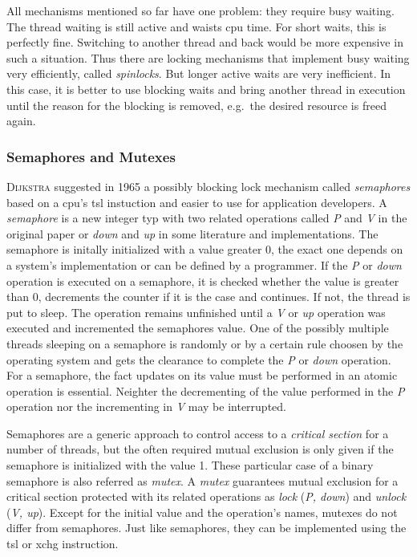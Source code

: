All mechanisms mentioned so far have one problem: they require busy waiting.
The thread waiting is still active and waists \ac{cpu} time.
For short waits, this is perfectly fine.  
Switching to another thread and back would be more expensive in such a situation\cite{glatz2015betriebssysteme}. 
Thus there are locking mechanisms that implement busy waiting very efficiently, called \textit{spinlocks}\cite{tanenbaum-modern-operating-systems}.
But longer active waits are very inefficient.
In this case, it is better to use blocking waits and bring another thread in execution until the reason for the blocking is removed, e.g.\ the desired resource is freed again.

\subsubsection*{Semaphores and Mutexes}
\textsc{Dijkstra} suggested in 1965 a possibly blocking lock mechanism called \textit{semaphores} based on a \ac{cpu}'s \ac{tsl} instuction and easier to use for application developers.
A \textit{semaphore} is a new integer typ with two related operations called \textit{P} and \textit{V} in the original paper or \textit{down} and \textit{up} in some literature and implementations\cite{glatz2015betriebssysteme}.
The semaphore is initally initialized with a value greater 0, the exact one depends on a system's implementation or can be defined by a programmer.
If the \textit{P} or \textit{down} operation is executed on a semaphore, it is checked whether the value is greater than 0, decrements the counter if it is the case and continues. 
If not, the thread is put to sleep.
The operation remains unfinished until a \textit{V} or \textit{up} operation was executed and incremented the semaphores value.
One of the possibly multiple threads sleeping on a semaphore is randomly or by a certain rule choosen by the operating system and gets the clearance to complete the \textit{P} or \textit{down} operation\cite{tanenbaum-modern-operating-systems}.
For a semaphore, the fact updates on its value must be performed in an atomic operation is essential\cite{silberschatz2009operating}.
Neighter the decrementing of the value performed in the \textit{P} operation nor the incrementing in \textit{V} may be interrupted.

Semaphores are a generic approach to control access to a \textit{critical section} for a number of threads, but the often required mutual exclusion is only given if the semaphore is initialized with the value 1.
These particular case of a binary semaphore is also referred as \textit{mutex}.
A \textit{mutex} guarantees mutual exclusion for a critical section protected with its related operations as \textit{lock} (\textit{P, down}) and \textit{unlock} (\textit{V, up})\cite{tanenbaum-modern-operating-systems}.
Except for the initial value and the operation's names, mutexes do not differ from semaphores.
Just like semaphores, they can be implemented using the \ac{tsl} or \ac{xchg} instruction.


